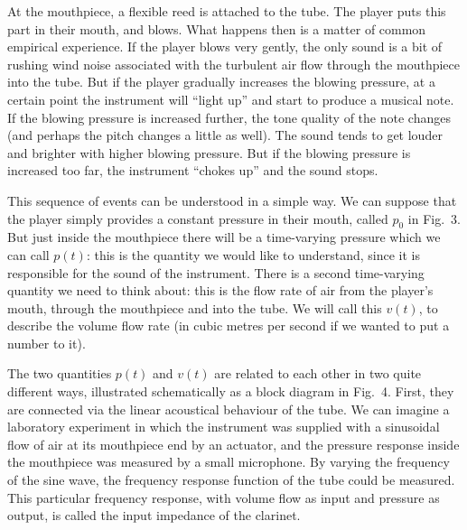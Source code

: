 
  At the mouthpiece, a flexible reed is attached to the tube. The player puts 
  this part in their mouth, and blows. What happens then is a matter of common 
  empirical experience. If the player blows very gently, the only sound is a 
  bit of rushing wind noise associated with the turbulent air flow through the 
  mouthpiece into the tube. But if the player gradually increases the blowing 
  pressure, at a certain point the instrument will “light up” and start to 
  produce a musical note. If the blowing pressure is increased further, the 
  tone quality of the note changes (and perhaps the pitch changes a little as 
  well). The sound tends to get louder and brighter with higher blowing 
  pressure. But if the blowing pressure is increased too far, the instrument 
  “chokes up” and the sound stops. 

  This sequence of events can be understood in a simple way. We can suppose 
  that the player simply provides a constant pressure in their mouth, called 
  $p_0$ in Fig.\ 3. But just inside the mouthpiece there will be a time-varying 
  pressure which we can call $p(t)$: this is the quantity we would like to 
  understand, since it is responsible for the sound of the instrument. There is 
  a second time-varying quantity we need to think about: this is the flow rate 
  of air from the player’s mouth, through the mouthpiece and into the tube. We 
  will call this $v(t)$, to describe the volume flow rate (in cubic metres per 
  second if we wanted to put a number to it). 

  The two quantities $p(t)$ and $v(t)$ are related to each other in two quite 
  different ways, illustrated schematically as a block diagram in Fig.\ 4. 
  First, they are connected via the linear acoustical behaviour of the tube. We 
  can imagine a laboratory experiment in which the instrument was supplied with 
  a sinusoidal flow of air at its mouthpiece end by an actuator, and the 
  pressure response inside the mouthpiece was measured by a small microphone. 
  By varying the frequency of the sine wave, the frequency response function of 
  the tube could be measured. This particular frequency response, with volume 
  flow as input and pressure as output, is called the input impedance of the 
  clarinet. 

